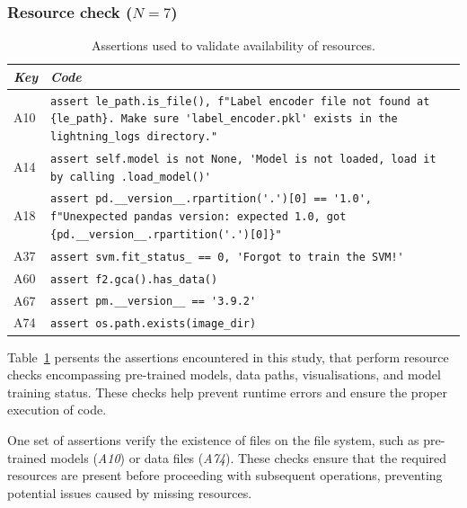 \subsubsection{Resource check ($N = 7$)}

\begin{table}
  \centering
  \begin{tabular}{@{}m{} m{}@{}}
    \toprule
    \emph{\textbf{Key}}&
    \emph{\textbf{Code}}\\
    \midrule

    A10 &
    \lstinline[]$assert le_path.is_file(), f"Label encoder file not found at {le_path}. Make sure 'label_encoder.pkl' exists in the lightning_logs directory."$\\

    A14 &
    \lstinline[]$assert self.model is not None, 'Model is not loaded, load it by calling .load_model()'$\\

    A18&
    \lstinline[]$assert pd.__version__.rpartition('.')[0] == '1.0', f"Unexpected pandas version: expected 1.0, got {pd.__version__.rpartition('.')[0]}"$\\

    A37 &
    \lstinline[]$assert svm.fit_status_ == 0, 'Forgot to train the SVM!'$\\

    A60 &
    \lstinline[]$assert f2.gca().has_data()$\\

    A67&
    \lstinline[]$assert pm.__version__ == '3.9.2'$\\

    A74 &
    \lstinline[]$assert os.path.exists(image_dir)$\\
    \bottomrule
  \end{tabular}
  \caption{Assertions used to validate availability of resources.}
  \label{tab:assert-resource-check}
\end{table}

Table~\ref{tab:assert-resource-check} persents the assertions encountered in this study, that perform resource checks encompassing pre-trained models, data paths, visualisations, and model training status. These checks help prevent runtime errors and ensure the proper execution of code.

One set of assertions verify the existence of files on the file system, such as pre-trained models (\emph{A10}) or data files (\emph{A74}). These checks ensure that the required resources are present before proceeding with subsequent operations, preventing potential issues caused by missing resources.

